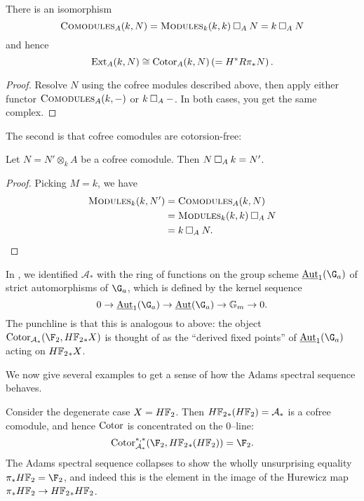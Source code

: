 \begin{corollary}\label{ExtAndCotorAgree}
There is an isomorphism \[\normalfont\textsc{Comodules}_A(k, N) = \normalfont\textsc{Modules}_k(k, k) \mathbin\square_A N = k \mathbin\square_A N\] and hence \[\operatorname{Ext}_A(k, N) \cong \operatorname{Cotor}_A(k, N) \left(= H^* R\pi_* N\right).\]
\end{corollary}
\begin{proof}
Resolve \(N\) using the cofree modules described above, then apply either functor \(\normalfont\textsc{Comodules}_A(k, -)\) or \(k \mathbin\square_A -\).  In both cases, you get the same complex.
\end{proof}

\noindent The second is that cofree comodules are cotorsion-free:

\begin{corollary}\label{CotensorReducesCofreeness}
Let \(N = N' \otimes_k A\) be a cofree comodule. Then \(N \mathbin\square_A k = N'\).
\end{corollary}
\begin{proof}
Picking \(M = k\), we have
\begin{align*}
\normalfont\textsc{Modules}_k(k, N') & = \normalfont\textsc{Comodules}_A(k, N) \\
& = \normalfont\textsc{Modules}_k(k, k) \mathbin\square_A N \\
& = k \mathbin\square_A N. \qedhere
\end{align*}
\end{proof}

\begin{example}\label{HF2HomologyIsValuedInAutGaEquivarModules}
In , we identified \(\mathcal A_*\) with the ring of functions on the group scheme \(\InternalAut_1(\G_a)\) of strict automorphisms of \(\G_a\), which is defined by the kernel sequence \[0 \to \InternalAut_1(\G_a) \to \InternalAut(\G_a) \to \Gm \to 0.\]  The punchline is that this is analogous to  above: the object \(\Cotor_{\mathcal A_*}(\F_2, \HFtwo_* X)\) is thought of as the ``derived fixed points'' of \(\InternalAut_1(\G_a)\) acting on \(\HFtwo_* X\).
\end{example}

We now give several examples to get a sense of how the Adams spectral sequence behaves.

\begin{example}
Consider the degenerate case \(X = \HFtwo\).  Then \(\HFtwo_*(\HFtwo) = \mathcal A_*\) is a cofree comodule, and hence \(\operatorname{Cotor}\) is concentrated on the \(0\)--line: \[\Cotor_{\mathcal A_*}^{*, *}(\F_2, \HFtwo_*(\HFtwo)) = \F_2.\]  The Adams spectral sequence collapses to show the wholly unsurprising equality \(\pi_* \HFtwo = \F_2\), and indeed this is the element in the image of the Hurewicz map \(\pi_* \HFtwo \to \HFtwo_* \HFtwo\).
\end{example}

